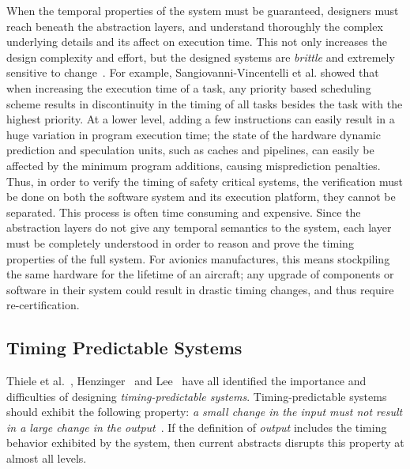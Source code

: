 When the temporal properties of the system must be guaranteed, designers must reach beneath the abstraction layers, and understand thoroughly the complex underlying details and its affect on execution time. 
This not only increases the design complexity and effort, but the designed systems are \emph{brittle} and extremely sensitive to change~\cite{Sangiovanni-Vincentelli2007automotive, Edwards2007PRETcase}.  
For example, Sangiovanni-Vincentelli et al.\cite{Sangiovanni-Vincentelli2007automotive} showed that when increasing the execution time of a task, any priority based scheduling scheme results in discontinuity in the timing of all tasks besides the task with the highest priority. 
At a lower level, adding a few instructions can easily result in a huge variation in program execution time; the state of the hardware dynamic prediction and speculation units, such as caches and pipelines, can easily be affected by the minimum program additions, causing misprediction penalties.
Thus, in order to verify the timing of safety critical systems, the verification must be done on both the software system and its execution platform, they cannot be separated. 
This process is often time consuming and expensive.
Since the abstraction layers do not give any temporal semantics to the system, each layer must be completely understood in order to reason and prove the timing properties of the full system.  
For avionics manufactures, this means stockpiling the same hardware for the lifetime of an aircraft; any upgrade of components or software in their system could result in drastic timing changes, and thus require re-certification.


\subsection{Timing Predictable Systems}
Thiele et al.~\cite{thiele_et_al:DSP:2004:2}, Henzinger~\cite{Henzinger2008} and Lee~\cite{LeeOnTime2005} have all identified the importance and difficulties of designing \emph{timing-predictable systems}.
Timing-predictable systems should exhibit the following property: \textit{a small change in the input must not result in a large change in the output}~\cite{Henzinger2008}.
If the definition of \emph{output} includes the timing behavior exhibited by the system, then current abstracts disrupts this property at almost all levels. 

